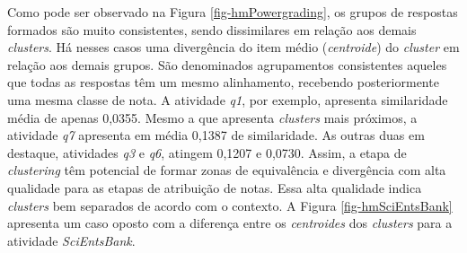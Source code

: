 Como pode ser observado na Figura \ref{fig-hmPowergrading}, os grupos de respostas formados são muito consistentes, sendo dissimilares em relação aos demais \textit{clusters}. Há nesses casos uma divergência do item médio (\textit{centroide}) do \textit{cluster} em relação aos demais grupos.  São denominados agrupamentos consistentes aqueles que todas as respostas têm um mesmo alinhamento, recebendo posteriormente uma mesma classe de nota. A atividade \textit{q1}, por exemplo, apresenta similaridade média de apenas 0,0355. Mesmo a que apresenta \textit{clusters} mais próximos, a atividade \textit{q7} apresenta em média 0,1387 de similaridade. As outras duas em destaque, atividades \textit{q3} e \textit{q6}, atingem 0,1207 e 0,0730. Assim, a etapa de \textit{clustering} têm potencial de formar zonas de equivalência e divergência com alta qualidade para as etapas de atribuição de notas. Essa alta qualidade indica \textit{clusters} bem separados de acordo com o contexto. A Figura \ref{fig-hmSciEntsBank} apresenta um caso oposto com a diferença entre os \textit{centroides} dos \textit{clusters} para a atividade \textit{SciEntsBank}.

